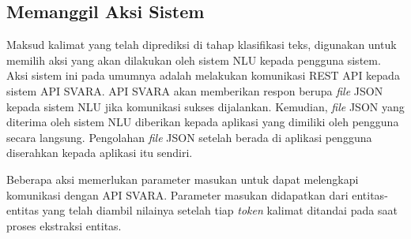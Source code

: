 \subsection{Memanggil Aksi Sistem}

Maksud kalimat yang telah diprediksi di tahap klasifikasi teks, digunakan untuk memilih aksi yang akan dilakukan oleh sistem NLU kepada pengguna sistem. Aksi sistem ini pada umumnya adalah melakukan komunikasi REST API kepada sistem API SVARA. API SVARA akan memberikan respon berupa \textit{file} JSON kepada sistem NLU jika komunikasi sukses dijalankan. Kemudian, \textit{file} JSON yang diterima oleh sistem NLU diberikan kepada aplikasi yang dimiliki oleh pengguna secara langsung. Pengolahan \textit{file} JSON setelah berada di aplikasi pengguna diserahkan kepada aplikasi itu sendiri.

Beberapa aksi memerlukan parameter masukan untuk dapat melengkapi komunikasi dengan API SVARA. Parameter masukan didapatkan dari entitas-entitas yang telah diambil nilainya setelah tiap \textit{token} kalimat ditandai pada saat proses ekstraksi entitas.